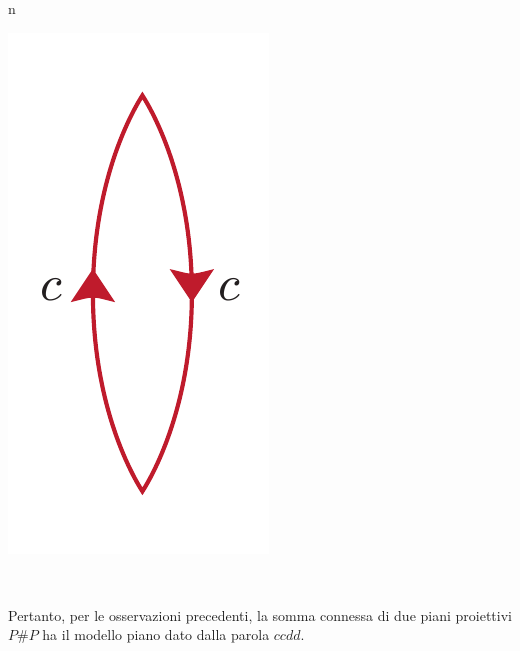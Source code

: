 \begin{remark}{n}
\begin{minipage}{.75\linewidth}
\end{minipage}
\begin{minipage}{.24\linewidth}
	\begin{center}
		\includegraphics[trim=0cm 0cm 0cm 0cm, clip, scale=0.3]{images/proj2lines.pdf}
	\end{center}
\end{minipage}\\
	\begin{minipage}{.75\linewidth}
	Pertanto, per le osservazioni precedenti, la somma connessa di due piani proiettivi $P\# P$ ha il modello piano dato dalla parola $ccdd$.
\end{minipage}
\begin{minipage}{.24\linewidth}
	\begin{center}

\end{center}
\end{minipage}
\end{remark}
